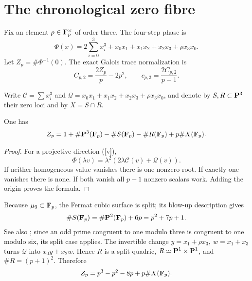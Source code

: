\section{The chronological zero fibre}

Fix an element \(\rho\in\mathbf F_p^\times\) of order three.  The four-step phase is
\begin{equation}\label{eq:phase}
 \Phi(x)=2\sum_{i=0}^{3}x_i^3+
 x_0x_1+x_1x_2+x_2x_3+\rho x_3x_0.
\end{equation}
Let \(Z_p=\#\Phi^{-1}(0)\).  The exact Galois trace normalization is
\begin{equation}\label{eq:moment}
 C_{p,2}=\frac{2Z_p}{p}-2p^2,
 \qquad c_{p,2}=\frac{2C_{p,2}}{p-1}.
\end{equation}

Write \(\mathcal C=\sum x_i^3\) and
\(\mathcal Q=x_0x_1+x_1x_2+x_2x_3+\rho x_3x_0\), and denote by
\(S,R\subset\mathbf P^3\) their zero loci and by \(X=S\cap R\).

\begin{proposition}\label{prop:direction}
One has
\[
 Z_p=1+\#\mathbf P^3(\mathbf F_p)-\#S(\mathbf F_p)-\#R(\mathbf F_p)+p\#X(\mathbf F_p).
\]
\end{proposition}

\begin{proof}
For a projective direction ([v]),
\[
 \Phi(\lambda v)=\lambda^2(2\lambda\mathcal C(v)+\mathcal Q(v)).
\]
If neither homogeneous value vanishes there is one nonzero root.  If exactly
one vanishes there is none.  If both vanish all \(p-1\) nonzero scalars work.
Adding the origin proves the formula.
\end{proof}

Because \(\mu_3\subset\mathbf F_p\), the Fermat cubic surface is split; its blow-up
description gives
\[
 \#S(\mathbf F_p)=\#\mathbf P^2(\mathbf F_p)+6p=p^2+7p+1.
\]
See also \cite[Corollary~8.3]{Massarenti2026}; since an odd prime congruent
to one modulo three is congruent to one modulo six, its split case applies.
The invertible change \(y=x_1+\rho x_3,\ w=x_1+x_3\) turns
\(\mathcal Q\) into \(x_0y+x_2w\).  Hence \(R\) is a split quadric,
\(R\simeq\mathbf P^1\times\mathbf P^1\), and \(\#R=(p+1)^2\).  Therefore
\begin{equation}\label{eq:zcount}
 Z_p=p^3-p^2-8p+p\#X(\mathbf F_p).
\end{equation}
